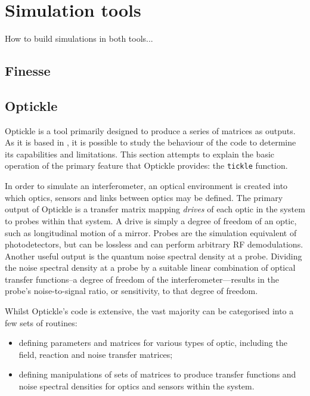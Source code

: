 \chapter{\label{a:simulation-tools}Simulation tools}
How to build simulations in both tools...


\section{Finesse}

\section{Optickle}
Optickle is a tool primarily designed to produce a series of matrices as outputs. As it is based in \MATLAB, it is possible to study the behaviour of the code to determine its capabilities and limitations. This section attempts to explain the basic operation of the primary feature that Optickle provides: the \lstinline!tickle! function.

In order to simulate an interferometer, an optical environment is created into which optics, sensors and links between optics may be defined. The primary output of Optickle is a transfer matrix mapping \emph{drives} of each optic in the system to probes within that system. A drive is simply a degree of freedom of an optic, such as longitudinal motion of a mirror. Probes are the simulation equivalent of photodetectors, but can be lossless and can perform arbitrary RF demodulations. Another useful output is the quantum noise spectral density at a probe. Dividing the noise spectral density at a probe by a suitable linear combination of optical transfer functions--a degree of freedom of the interferometer---results in the probe's noise-to-signal ratio, or sensitivity, to that degree of freedom.

Whilst Optickle's code is extensive, the vast majority can be categorised into a few sets of routines:

\begin{itemize}
  \item defining parameters and matrices for various types of optic, including the field, reaction and noise transfer matrices;
  \item defining manipulations of sets of matrices to produce transfer functions and noise spectral densities for optics and sensors within the system.
\end{itemize}

